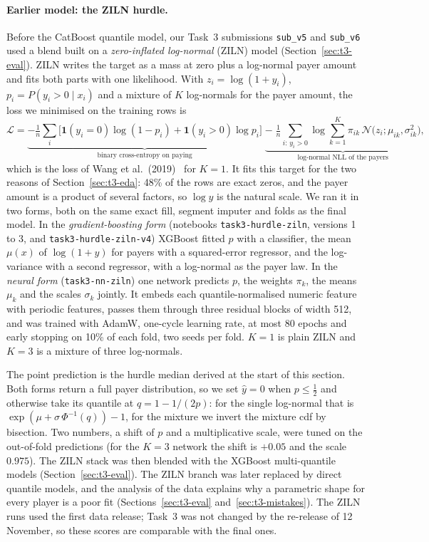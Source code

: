 \documentclass[../main.tex]{subfiles}
\begin{document}
\paragraph{Earlier model: the ZILN hurdle.} Before the CatBoost quantile model, our Task~3 submissions \texttt{sub\_v5} and \texttt{sub\_v6} used a blend built on a \emph{zero-inflated log-normal} (ZILN) model (Section~\ref{sec:t3-eval}). ZILN writes the target as a mass at zero plus a log-normal payer amount and fits both parts with one likelihood. With $z_i=\log(1+y_i)$, $p_i=P(y_i>0\mid x_i)$ and a mixture of $K$ log-normals for the payer amount, the loss we minimised on the training rows is
\[
\mathcal L=\underbrace{-\tfrac1n\sum_i\bigl[\mathbf{1}(y_i{=}0)\log(1-p_i)+\mathbf{1}(y_i{>}0)\log p_i\bigr]}_{\text{binary cross-entropy on paying}}
\;\underbrace{-\;\tfrac1n\sum_{i:\,y_i>0}\log\sum_{k=1}^{K}\pi_{ik}\,\mathcal N\!\bigl(z_i;\mu_{ik},\sigma_{ik}^2\bigr)}_{\text{log-normal NLL of the payers}} ,
\]
which is the loss of Wang et al.\ (2019)~\citep{ziln} for $K=1$. It fits this target for the two reasons of Section~\ref{sec:t3-eda}: 48\% of the rows are exact zeros, and the payer amount is a product of several factors, so $\log y$ is the natural scale. We ran it in two forms, both on the same exact fill, segment imputer and folds as the final model. In the \emph{gradient-boosting form} (notebooks \texttt{task3-hurdle-ziln}, versions 1 to 3, and \texttt{task3-hurdle-ziln-v4}) XGBoost fitted $p$ with a classifier, the mean $\mu(x)$ of $\log(1+y)$ for payers with a squared-error regressor, and the log-variance with a second regressor, with a log-normal as the payer law. In the \emph{neural form} (\texttt{task3-nn-ziln}) one network predicts $p$, the weights $\pi_k$, the means $\mu_k$ and the scales $\sigma_k$ jointly. It embeds each quantile-normalised numeric feature with periodic features, passes them through three residual blocks of width 512, and was trained with AdamW, one-cycle learning rate, at most 80 epochs and early stopping on 10\% of each fold, two seeds per fold. $K=1$ is plain ZILN and $K=3$ is a mixture of three log-normals.

The point prediction is the hurdle median derived at the start of this section. Both forms return a full payer distribution, so we set $\hat y=0$ when $p\le\tfrac12$ and otherwise take its quantile at $q=1-1/(2p)$: for the single log-normal that is $\exp(\mu+\sigma\,\Phi^{-1}(q))-1$, for the mixture we invert the mixture cdf by bisection. Two numbers, a shift of $p$ and a multiplicative scale, were tuned on the out-of-fold predictions (for the $K=3$ network the shift is $+0.05$ and the scale $0.975$). The ZILN stack was then blended with the XGBoost multi-quantile models (Section~\ref{sec:t3-eval}). The ZILN branch was later replaced by direct quantile models, and the analysis of the data explains why a parametric shape for every player is a poor fit (Sections~\ref{sec:t3-eval} and~\ref{sec:t3-mistakes}). The ZILN runs used the first data release; Task~3 was not changed by the re-release of 12 November, so these scores are comparable with the final ones.
\end{document}
